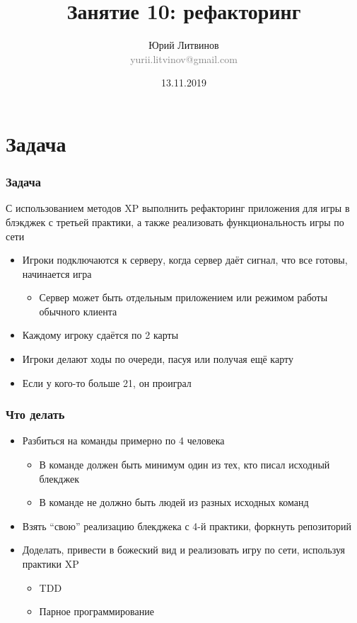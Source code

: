 \documentclass[xetex,mathserif,serif]{beamer}
\title{Занятие 10: рефакторинг}
\author[Юрий Литвинов]{Юрий Литвинов\\\small{\textcolor{gray}{yurii.litvinov@gmail.com}}}
\date{13.11.2019}
\begin{document}
	\frame{\titlepage}

	\section{Задача}

	\begin{frame}
		\frametitle{Задача}
		С использованием методов XP выполнить рефакторинг приложения для игры в блэкджек с третьей практики, а также реализовать функциональность игры по сети
		\begin{itemize}
			\item Игроки подключаются к серверу, когда сервер даёт сигнал, что все готовы, начинается игра
			\begin{itemize}
				\item Сервер может быть отдельным приложением или режимом работы обычного клиента
			\end{itemize}
			\item Каждому игроку сдаётся по 2 карты
			\item Игроки делают ходы по очереди, пасуя или получая ещё карту
			\item Если у кого-то больше 21, он проиграл
		\end{itemize}
	\end{frame}

	\begin{frame}
		\frametitle{Что делать}
		\begin{itemize}
			\item Разбиться на команды примерно по 4 человека
			\begin{itemize}
				\item В команде должен быть минимум один из тех, кто писал исходный блекджек
				\item В команде не должно быть людей из разных исходных команд 
			\end{itemize}
			\item Взять ``свою'' реализацию блекджека с 4-й практики, форкнуть репозиторий
			\item Доделать, привести в божеский вид и реализовать игру по сети, используя практики XP
			\begin{itemize}
				\item TDD
				\item Парное программирование
			\end{itemize}
		\end{itemize}
	\end{frame}
\end{document}
